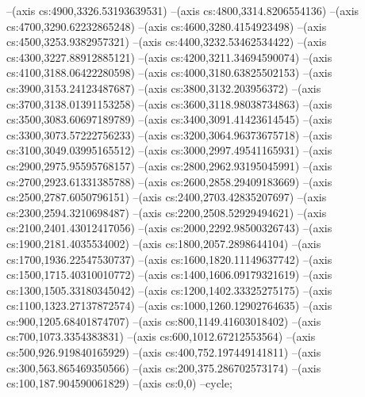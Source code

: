 --(axis cs:4900,3326.53193639531)
--(axis cs:4800,3314.8206554136)
--(axis cs:4700,3290.62232865248)
--(axis cs:4600,3280.4154923498)
--(axis cs:4500,3253.9382957321)
--(axis cs:4400,3232.53462534422)
--(axis cs:4300,3227.88912885121)
--(axis cs:4200,3211.34694590074)
--(axis cs:4100,3188.06422280598)
--(axis cs:4000,3180.63825502153)
--(axis cs:3900,3153.24123487687)
--(axis cs:3800,3132.203956372)
--(axis cs:3700,3138.01391153258)
--(axis cs:3600,3118.98038734863)
--(axis cs:3500,3083.60697189789)
--(axis cs:3400,3091.41423614545)
--(axis cs:3300,3073.57222756233)
--(axis cs:3200,3064.96373675718)
--(axis cs:3100,3049.03995165512)
--(axis cs:3000,2997.49541165931)
--(axis cs:2900,2975.95595768157)
--(axis cs:2800,2962.93195045991)
--(axis cs:2700,2923.61331385788)
--(axis cs:2600,2858.29409183669)
--(axis cs:2500,2787.6050796151)
--(axis cs:2400,2703.42835207697)
--(axis cs:2300,2594.3210698487)
--(axis cs:2200,2508.52929494621)
--(axis cs:2100,2401.43012417056)
--(axis cs:2000,2292.98500326743)
--(axis cs:1900,2181.4035534002)
--(axis cs:1800,2057.2898644104)
--(axis cs:1700,1936.22547530737)
--(axis cs:1600,1820.11149637742)
--(axis cs:1500,1715.40310010772)
--(axis cs:1400,1606.09179321619)
--(axis cs:1300,1505.33180345042)
--(axis cs:1200,1402.33325275175)
--(axis cs:1100,1323.27137872574)
--(axis cs:1000,1260.12902764635)
--(axis cs:900,1205.68401874707)
--(axis cs:800,1149.41603018402)
--(axis cs:700,1073.3354383831)
--(axis cs:600,1012.67212553564)
--(axis cs:500,926.919840165929)
--(axis cs:400,752.197449141811)
--(axis cs:300,563.865469350566)
--(axis cs:200,375.286702573174)
--(axis cs:100,187.904590061829)
--(axis cs:0,0)
--cycle;

